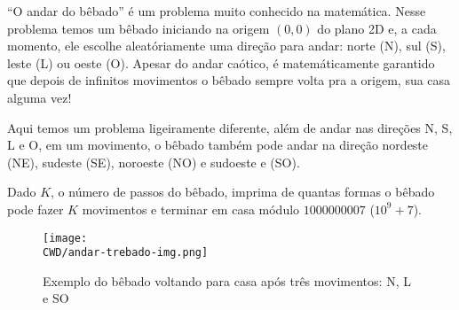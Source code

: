 %
“O andar do bêbado” é um problema muito conhecido na matemática. Nesse problema temos um bêbado iniciando na origem $(0, 0)$ do plano 2D e, a cada momento, ele escolhe aleatóriamente uma direção para andar: norte (N), sul (S), leste (L) ou oeste (O). Apesar do andar caótico, é matemáticamente garantido que depois de infinitos movimentos o bêbado sempre volta pra a origem, sua casa alguma vez!

Aqui temos um problema ligeiramente diferente, além de andar nas direções N, S, L e O, em um movimento, o bêbado também pode andar na direção nordeste (NE), sudeste (SE), noroeste (NO) e sudoeste e (SO). 

Dado $K$, o número de passos do bêbado, imprima de quantas formas o bêbado pode fazer $K$ movimentos e terminar em casa módulo $1000000007$ ($10^9 + 7$).

\begin{figure}[H]
    \centering
    \texttt{[image: \\CWD/andar-trebado-img.png]}
    \caption{Exemplo do bêbado voltando para casa após três movimentos: N, L e SO}
\end{figure}

%

%
%



\sampleio
